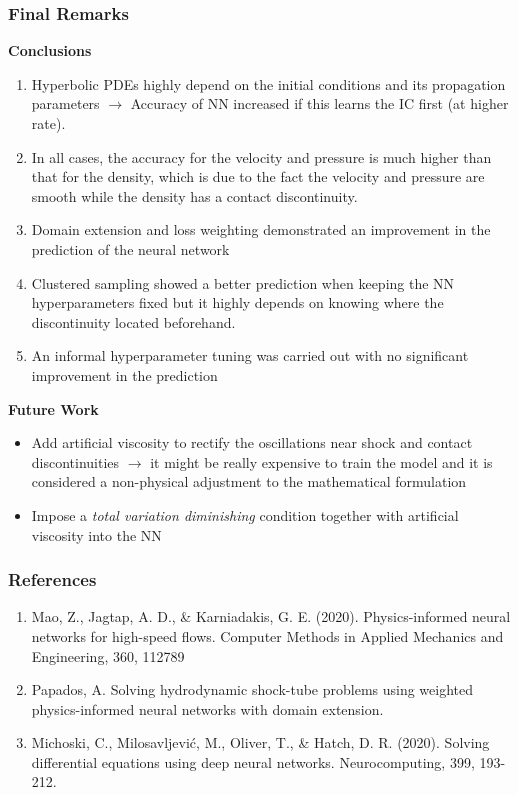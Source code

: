 \documentclass[aspectratio=169]{beamer}
\begin{document}
\begin{frame}\frametitle{Final Remarks}
	
	\textbf{\textcolor{myOrange}{Conclusions}} 
	\begin{enumerate}
		\item Hyperbolic PDEs highly depend on the initial conditions and its propagation parameters $\rightarrow$ Accuracy of NN increased if this learns the IC first (at higher rate).
		\item In all cases, the accuracy for the velocity and pressure is much higher than that for the density, which is due to the fact the
		velocity and pressure are smooth while the density has a contact discontinuity.
		\item Domain extension and loss weighting demonstrated an improvement in the prediction of the neural network
		\item Clustered sampling showed a better prediction when keeping the NN hyperparameters fixed but it highly depends
		on knowing where the discontinuity located beforehand.
		\item An informal hyperparameter tuning was carried out with no significant improvement in the prediction
	\end{enumerate}
	
	\textbf{\textcolor{myOrange}{Future Work}}
	\begin{itemize}
		\item Add artificial viscosity to rectify the oscillations near shock and contact discontinuities $\rightarrow$ it might
		be really expensive to train the model and it is considered a non-physical adjustment to the mathematical formulation
		\item Impose a \textit{total variation diminishing} condition together with artificial viscosity into the NN  
		
	\end{itemize}
	
\end{frame}


\begin{frame}\frametitle{References}
	
	\begin{enumerate}
		\item Mao, Z., Jagtap, A. D., \& Karniadakis, G. E. (2020). Physics-informed neural networks for high-speed flows. Computer Methods in Applied Mechanics and Engineering, 360, 112789
		\item Papados, A. Solving hydrodynamic shock-tube problems using weighted physics-informed neural networks with domain extension.
		\item Michoski, C., Milosavljević, M., Oliver, T., \& Hatch, D. R. (2020). Solving differential equations using deep neural networks. Neurocomputing, 399, 193-212.
	\end{enumerate}
	
\end{frame}
\end{document}
